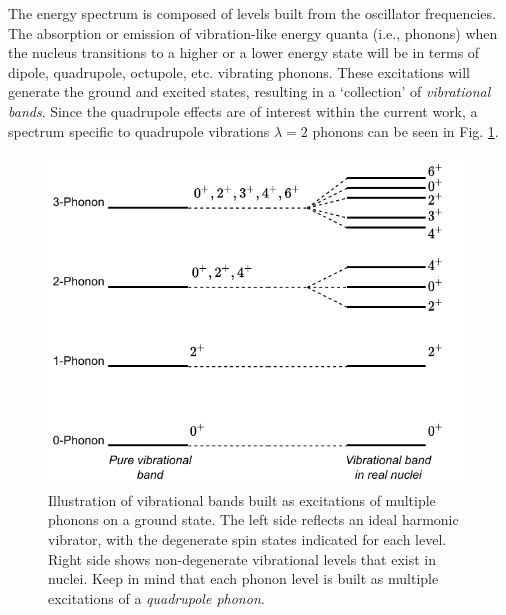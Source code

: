 The energy spectrum is composed of levels built from the oscillator frequencies. The absorption or emission of vibration-like energy quanta (i.e., phonons) when the nucleus transitions to a higher or a lower energy state will be in terms of dipole, quadrupole, octupole, etc. vibrating phonons. These excitations will generate the ground and excited states, resulting in a `collection' of \emph{vibrational bands}. Since the quadrupole effects are of interest within the current work, a spectrum specific to quadrupole vibrations $\lambda=2$ phonons can be seen in Fig. \ref{fig-vibrational-bands}.
\begin{figure}
    \centering
    \includegraphics[width=0.99\textwidth]{Chapters/Figures/vibrational_states.pdf}
    \caption{Illustration of vibrational bands built as excitations of multiple phonons on a ground state. The left side reflects an ideal harmonic vibrator, with the degenerate spin states indicated for each level. Right side shows non-degenerate vibrational levels that exist in nuclei. Keep in mind that each phonon level is built as multiple excitations of a \emph{quadrupole phonon}.}
    \label{fig-vibrational-bands}
\end{figure}


